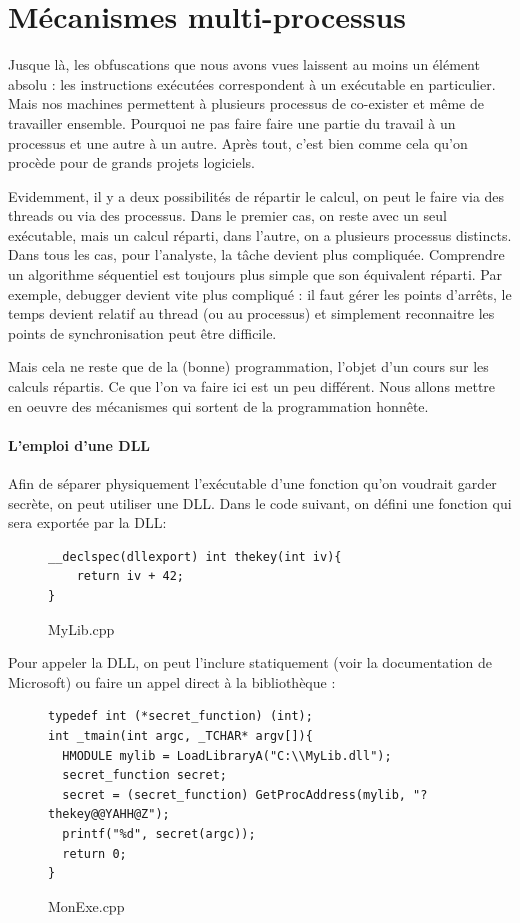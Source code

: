\documentclass{book}
\begin{document}
\section{Mécanismes multi-processus}

Jusque là, les obfuscations que nous avons vues laissent au moins un élément absolu : les instructions exécutées correspondent à un exécutable en particulier. Mais nos machines permettent à plusieurs processus de co-exister et même de travailler ensemble. Pourquoi ne pas faire faire une partie du travail à un processus et une autre à un autre. Après tout, c'est bien comme cela qu'on procède pour de grands projets logiciels.

Evidemment, il y a deux possibilités de répartir le calcul, on peut le faire via des threads ou via des processus. Dans le premier cas, on reste avec un seul exécutable, mais un calcul réparti, dans l'autre, on a plusieurs processus distincts. Dans tous les cas, pour l'analyste, la tâche devient plus compliquée. Comprendre un algorithme séquentiel est toujours plus simple que son équivalent réparti. Par exemple, debugger devient vite plus compliqué : il faut gérer les points d'arrêts, le temps devient relatif au thread (ou au processus) et simplement reconnaitre les points de synchronisation peut être difficile. 

Mais cela ne reste que de la (bonne) programmation, l'objet d'un cours sur les calculs répartis. Ce que l'on va faire ici est un peu différent. Nous allons mettre en oeuvre des mécanismes qui sortent de la programmation honnête.

\paragraph{L'emploi d'une DLL}

Afin de séparer physiquement l'exécutable d'une fonction qu'on voudrait garder secrète, on peut utiliser une DLL. Dans le code suivant, on défini une fonction qui sera exportée par la DLL:
\begin{figure}[H]
\begin{verbatim}
__declspec(dllexport) int thekey(int iv){
	return iv + 42;
}
\end{verbatim}
\caption{MyLib.cpp}
\end{figure}
Pour appeler la DLL, on peut l'inclure statiquement (voir la documentation de Microsoft) ou faire un appel direct à la bibliothèque : 

\begin{figure}[H]
\begin{verbatim}
typedef int (*secret_function) (int);
int _tmain(int argc, _TCHAR* argv[]){
  HMODULE mylib = LoadLibraryA("C:\\MyLib.dll");
  secret_function secret;
  secret = (secret_function) GetProcAddress(mylib, "?thekey@@YAHH@Z");
  printf("%d", secret(argc));
  return 0;
}
\end{verbatim}
\caption{MonExe.cpp}
\end{figure}
\end{document}
